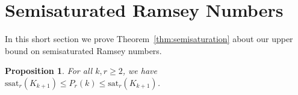 \documentclass[12pt]{article}
\newtheorem{proposition}{Proposition}
\theoremstyle{definition}
\begin{document}
	
	
	
	\section{Semisaturated Ramsey Numbers}\label{section: Tran}
	In this short section we prove Theorem~\ref{thm:semisaturation} about our upper bound on semisaturated Ramsey numbers. 
%	
	\iffalse
	\begin{proposition}\label{prop:saturationinequalities}
		For all $k,r \geq 2$, we have $\mathrm{ssat}_r(K_{k+1}) \leq P_r(k) \leq \mathrm{sat}_r(K_{k+1})$.	
	\end{proposition}	
	
\end{document}
